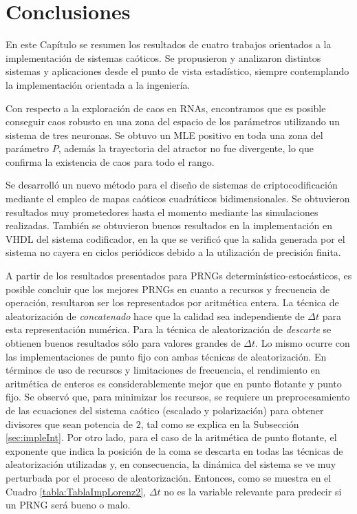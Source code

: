\section{Conclusiones}

En este Capítulo se resumen los resultados de cuatro trabajos orientados a la implementación de sistemas caóticos.
Se propusieron y analizaron distintos sistemas y aplicaciones desde el punto de vista estadístico, siempre contemplando la implementación orientada a la ingeniería.

Con respecto a la exploración de caos en RNAs, encontramos que es posible conseguir caos robusto en una zona del espacio de los parámetros utilizando un sistema de tres neuronas.
Se obtuvo un MLE positivo en toda una zona del parámetro $P$, además la trayectoria del atractor no fue divergente, lo que confirma la existencia de caos para todo el rango.

Se desarrolló un nuevo método para el diseño de sistemas de criptocodificación mediante el empleo de mapas caóticos cuadráticos bidimensionales.
Se obtuvieron resultados muy prometedores hasta el momento mediante las simulaciones realizadas.
También se obtuvieron buenos resultados en la implementación en VHDL del sistema codificador, en la que se verificó que la salida generada por el sistema no cayera en ciclos periódicos debido a la utilización de precisión finita.

A partir de los resultados presentados para PRNGs determinístico-estocásticos, es posible concluir que los mejores PRNGs en cuanto a recursos y frecuencia de operación, resultaron ser los representados por aritmética entera.
La técnica de aleatorización de \textit{concatenado} hace que la calidad sea independiente de $\Delta t$ para esta representación numérica.
Para la técnica de aleatorización de \textit{descarte} se obtienen buenos resultados sólo para valores grandes de $\Delta t$.
Lo mismo ocurre con las implementaciones de punto fijo con ambas técnicas de aleatorización.
En términos de uso de recursos y limitaciones de frecuencia, el rendimiento en aritmética de enteros es considerablemente mejor que en punto flotante y punto fijo.
Se observó que, para minimizar los recursos, se requiere un preprocesamiento de las ecuaciones del sistema caótico (escalado y polarización) para obtener divisores que sean potencia de $2$, tal como se explica en la Subsección \ref{sec:impleInt}.
Por otro lado, para el caso de la aritmética de punto flotante, el exponente que indica la posición de la coma se descarta en todas las técnicas de aleatorización utilizadas y, en consecuencia, la dinámica del sistema se ve muy perturbada por el proceso de aleatorización.
Entonces, como se muestra en el Cuadro \ref{tabla:TablaImpLorenz2}, $\Delta t $ no es la variable relevante para predecir si un PRNG será bueno o malo.

